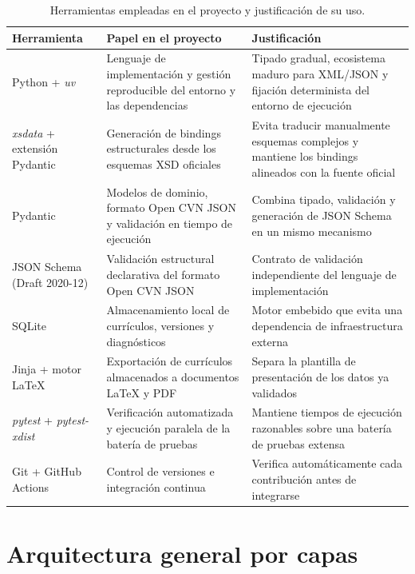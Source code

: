 \begin{table}[htbp]
  \centering
  \small
  \renewcommand{\arraystretch}{1.2}
  \begin{tabular}{p{} p{} p{}}
    \hline
    \textbf{Herramienta} & \textbf{Papel en el proyecto} & \textbf{Justificación} \\
    \hline
    Python + \textit{uv} & Lenguaje de implementación y gestión reproducible del entorno y las dependencias & Tipado gradual, ecosistema maduro para XML/JSON y fijación determinista del entorno de ejecución \\
    \textit{xsdata} + extensión Pydantic & Generación de bindings estructurales desde los esquemas XSD oficiales & Evita traducir manualmente esquemas complejos y mantiene los bindings alineados con la fuente oficial \\
    Pydantic & Modelos de dominio, formato Open CVN JSON y validación en tiempo de ejecución & Combina tipado, validación y generación de JSON Schema en un mismo mecanismo \\
    JSON Schema (Draft 2020-12) & Validación estructural declarativa del formato Open CVN JSON & Contrato de validación independiente del lenguaje de implementación \\
    SQLite & Almacenamiento local de currículos, versiones y diagnósticos & Motor embebido que evita una dependencia de infraestructura externa \\
    Jinja + motor LaTeX & Exportación de currículos almacenados a documentos LaTeX y PDF & Separa la plantilla de presentación de los datos ya validados \\
    \textit{pytest} + \textit{pytest-xdist} & Verificación automatizada y ejecución paralela de la batería de pruebas & Mantiene tiempos de ejecución razonables sobre una batería de pruebas extensa \\
    Git + GitHub Actions & Control de versiones e integración continua & Verifica automáticamente cada contribución antes de integrarse \\
    \hline
  \end{tabular}
  \caption{Herramientas empleadas en el proyecto y justificación de su uso.}
  \label{tab:metodologia_herramientas}
\end{table}

\section{Arquitectura general por capas}
\label{sec:metodologia_arquitectura}

